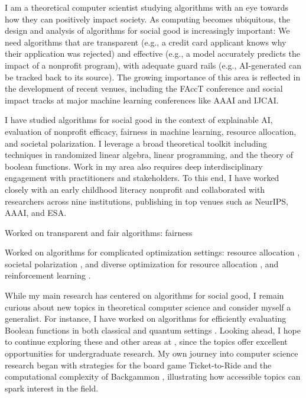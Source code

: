 \documentclass[11pt]{article}
\begin{document}
{\setlength{\parindent}{0cm}

I am a theoretical computer scientist studying algorithms with an eye towards how they can positively impact society. As computing becomes ubiquitous, the design and analysis of algorithms for social good is increasingly important: We need algorithms that are transparent (e.g., a credit card applicant knows why their application was rejected) and
effective (e.g., a model accurately predicts the impact of a nonprofit program), with adequate guard rails (e.g., AI-generated can be tracked back to its source).
The growing importance of this area is reflected in the development of recent venues, including the FAccT conference and social impact tracks at major machine learning conferences like AAAI and IJCAI.

I have studied algorithms for social good in the context of explainable AI, evaluation of nonprofit efficacy, fairness in machine learning, resource allocation, and societal polarization. I leverage a broad theoretical toolkit including techniques in randomized linear algebra, linear programming, and the theory of boolean functions. Work in my area also requires deep interdisciplinary engagement with practitioners and stakeholders. To this end, I have worked closely with an early childhood literacy nonprofit and collaborated with researchers across nine institutions, publishing in top venues such as NeurIPS, AAAI, and ESA.

Worked on transparent and fair algorithms: fairness \cite{rosenblatt2023counterfactual,witter2024fairlyuncertain}

Worked on algorithms for complicated optimization settings: resource allocation \cite{witter2024minimizing}, societal polarization \cite{musco2022quantify}, and diverse optimization for resource allocation \cite{hellerstein2022local}, and reinforcement learning \cite{witter2024i}.

While my main research has centered on algorithms for social good, I remain curious about new topics in theoretical computer science and consider myself a generalist. For instance, I have worked on algorithms for efficiently evaluating Boolean functions in both classical \cite{hellerstein2022adaptivity} and quantum settings \cite{czekanski2023robust,kimmel2021query,delorenzo2019applications}. Looking ahead, I hope to continue exploring these and other areas at \school, since the topics offer excellent opportunities for undergraduate research. My own journey into computer science research began with strategies for the board game Ticket-to-Ride \cite{witter2020applications} and the computational complexity of Backgammon \cite{witter2021backgammon}, illustrating how accessible topics can spark interest in the field.

}
\end{document}
